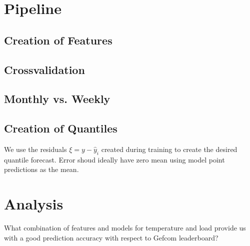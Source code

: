 \documentclass[conference]{IEEEtran}
\begin{document}

\section{Pipeline}

\subsection{Creation of Features}

\subsection{Crossvalidation}

\subsection{Monthly vs. Weekly}

\subsection{Creation of Quantiles}
We use the residuals $\xi=y-\hat{y}_i$ created during training to create the desired quantile forecast.
Error shoud ideally have zero mean
using model point predictions as the mean. 

\section{Analysis}
What combination of features and models for temperature and load provide us with a good prediction accuracy with respect to Gefcom leaderboard?
\end{document}
